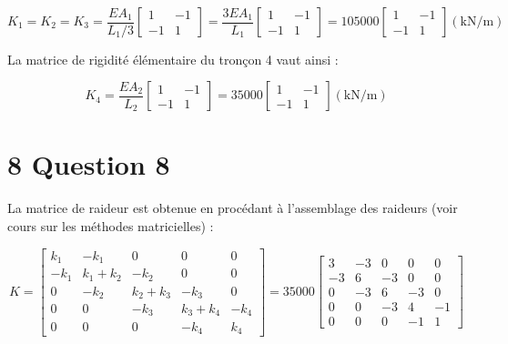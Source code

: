 \documentclass[11pt,a4paper]{report}
\begin{document}
{$$
K_{1}=K_{2}=K_{3}=\frac{E A_{1}}{L_{1} / 3}\left[\begin{array}{cc}
1 & -1 \\
-1 & 1
\end{array}\right]=\frac{3 E A_{1}}{L_{1}}\left[\begin{array}{cc}
1 & -1 \\
-1 & 1
\end{array}\right]=105000\left[\begin{array}{cc}
1 & -1 \\
-1 & 1
\end{array}\right](\mathrm{kN} / \mathrm{m})
$$

La matrice de rigidité élémentaire du tronçon 4 vaut ainsi :

$$
K_{4}=\frac{E A_{2}}{L_{2}}\left[\begin{array}{cc}
1 & -1 \\
-1 & 1
\end{array}\right]=35000\left[\begin{array}{cc}
1 & -1 \\
-1 & 1
\end{array}\right](\mathrm{kN} / \mathrm{m})
$$

\section*{8 Question 8}
La matrice de raideur est obtenue en procédant à l'assemblage des raideurs (voir cours sur les méthodes matricielles) :

$$
K=\left[\begin{array}{ccccc}
k_{1} & -k_{1} & 0 & 0 & 0 \\
-k_{1} & k_{1}+k_{2} & -k_{2} & 0 & 0 \\
0 & -k_{2} & k_{2}+k_{3} & -k_{3} & 0 \\
0 & 0 & -k_{3} & k_{3}+k_{4} & -k_{4} \\
0 & 0 & 0 & -k_{4} & k_{4}
\end{array}\right]=35000\left[\begin{array}{lrcrr}
3 & -3 & 0 & 0 & 0 \\
-3 & 6 & -3 & 0 & 0 \\
0 & -3 & 6 & -3 & 0 \\
0 & 0 & -3 & 4 & -1 \\
0 & 0 & 0 & -1 & 1
\end{array}\right]
$$

}
\end{document}
